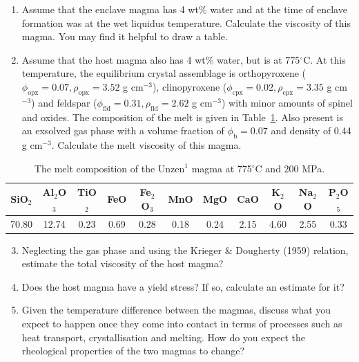 \documentclass[]{book}
\theoremstyle{definition}
\begin{document}
\begin{enumerate}
  \begin{enumerate}
    \setcounter{enumii}{0}
  \item Assume that the enclave magma has 4 wt\% water and at the time of enclave formation was at the wet liquidus temperature. Calculate the viscosity of this magma. You may find it helpful to draw a table.
  \item Assume that the host magma also has 4 wt\% water, but is at 775$ ^{\circ}$C. At this temperature, the equilibrium crystal assemblage is orthopyroxene ($\phi_{\text{opx}} = 0.07, \rho_{\text{opx}} = 3.52$ g cm$^{-3}$), clinopyroxene ($\phi_{\text{cpx}} = 0.02, \rho_{\text{cpx}} = 3.35$ g cm$^{-3}$) and feldspar ($\phi_{\text{fld}} = 0.31, \rho_{\text{fld}} = 2.62$ g cm$^{-3}$) with minor amounts of spinel and oxides. The composition of the melt is given in Table~\ref{tab:cold_comp}. Also present is an exsolved gas phase with a volume fraction of $\phi_{\text{b}} = 0.07$ and density of 0.44 g cm$^{-3}$. Calculate the melt viscosity of this magma. 
  \end{enumerate}

  \begin{table}
    \centering
    \caption{The melt composition of the Unzen$^{1}$ magma at 775$ ^{\circ}$C and 200 MPa. \label{tab:cold_comp}}
    \begin{tabular}{|c c c c c c c c c c c|}
      \hline
      SiO$_{2}$ & Al$_{2}$O$_{3}$ & TiO$_{2}$ & FeO & Fe$_{2}$O$_{3}$ & MnO & MgO & CaO & K$_{2}$O & Na$_{2}$O & P$_{2}$O$_{5}$ \\
      \hline
      70.80 & 12.74 & 0.23 & 0.69 & 0.28 & 0.18 & 0.24 & 2.15 & 4.60 & 2.55 & 0.33 \\
      \hline
    \end{tabular}
  \end{table}

  \begin{enumerate}
    \setcounter{enumii}{2}
  \item Neglecting the gas phase and using the Krieger \& Dougherty (1959) relation, estimate the total viscosity of the host magma? \\
  \item Does the host magma have a yield stress? If so, calculate an estimate for it? \\
  \item Given the temperature difference between the magmas, discuss what you expect to happen once they come into contact in terms of processes such as heat transport, crystallisation and melting. How do you expect the rheological properties of the two magmas to change?
  \end{enumerate}


\end{enumerate}
\end{document}
